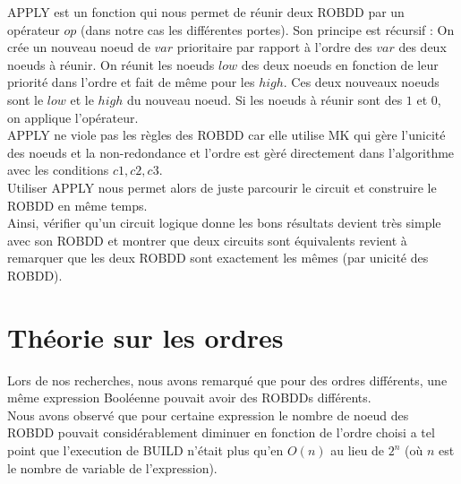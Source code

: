 \documentclass[a4paper, oneside]{report}
\begin{document}
APPLY est un fonction qui nous permet de réunir deux ROBDD par un opérateur $op$ (dans notre cas les différentes portes). Son principe est récursif : On crée un nouveau noeud de $var$ prioritaire par rapport à l'ordre des $var$ des deux noeuds à réunir. On réunit les noeuds $low$ des deux noeuds en fonction de leur priorité dans l'ordre et fait de même pour les $high$. Ces deux nouveaux noeuds sont le $low$ et le $high$ du nouveau noeud. Si les noeuds à réunir sont des $1$ et $0$, on applique l'opérateur.\\

APPLY ne viole pas les règles des ROBDD car elle utilise MK qui gère l'unicité des noeuds et la non-redondance et l'ordre est gèré directement dans l'algorithme avec les conditions $c1, c2, c3$.\\

Utiliser APPLY nous permet alors de juste parcourir le circuit et construire le ROBDD en même temps.\\


Ainsi, vérifier qu'un circuit logique donne les bons résultats devient très simple avec son ROBDD et montrer que deux circuits sont équivalents revient à remarquer que les deux ROBDD sont exactement les mêmes (par unicité des ROBDD).


\newpage

\section{Théorie sur les ordres}

Lors de nos recherches, nous avons remarqué que pour des ordres différents, une même expression Booléenne pouvait avoir des ROBDDs différents.\\
Nous avons observé que pour certaine expression le nombre de noeud des ROBDD pouvait considérablement diminuer en fonction de l'ordre choisi a tel point que l'execution de BUILD n'était plus qu'en $O(n)$ au lieu de $2^n$ (où $n$ est le nombre de variable de l'expression).\\
\end{document}
